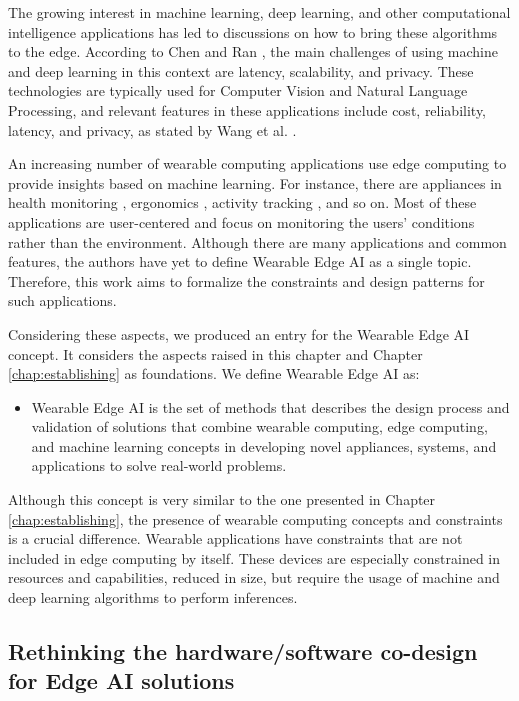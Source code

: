 The growing interest in machine learning, deep learning, and other computational intelligence applications has led to discussions on how to bring these algorithms to the edge. According to Chen and Ran \cite{chen2019deep}, the main challenges of using machine and deep learning in this context are latency, scalability, and privacy. These technologies are typically used for Computer Vision and Natural Language Processing, and relevant features in these applications include cost, reliability, latency, and privacy, as stated by Wang et al. \cite{wang2020convergence}.
 
An increasing number of wearable computing applications use edge computing to provide insights based on machine learning. For instance, there are appliances in health monitoring \cite{manogaran2019wearable,uddin2019wearable,liu2018cooperative}, ergonomics \cite{vega2019p}, activity tracking \cite{kumari2017wearable}, and so on. Most of these applications are user-centered and focus on monitoring the users' conditions rather than the environment. Although there are many applications and common features, the authors have yet to define Wearable Edge AI as a single topic. Therefore, this work aims to formalize the constraints and design patterns for such applications.

Considering these aspects, we produced an entry for the Wearable Edge AI concept. It considers the aspects raised in this chapter and Chapter \ref{chap:establishing} as foundations. We define Wearable Edge AI as:

\begin{itemize}
	\item Wearable Edge AI is the set of methods that describes the design process and validation of solutions that combine wearable computing, edge computing, and machine learning concepts in developing novel appliances, systems, and applications to solve real-world problems.
\end{itemize}

Although this concept is very similar to the one presented in Chapter \ref{chap:establishing}, the presence of wearable computing concepts and constraints is a crucial difference. Wearable applications have constraints that are not included in edge computing by itself. These devices are especially constrained in resources and capabilities, reduced in size, but require the usage of machine and deep learning algorithms to perform inferences.

\subsection{Rethinking the hardware/software co-design for Edge AI solutions}
 

